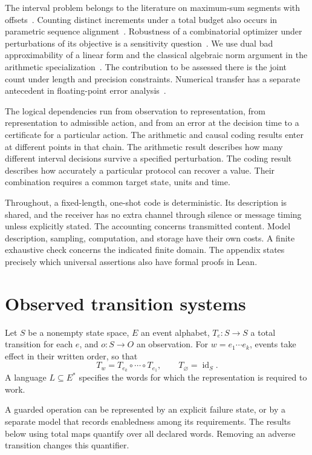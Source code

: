 The interval problem belongs to the literature on maximum-sum segments with offsets~\cite{sakai,jo}. Counting distinct increments under a total budget also occurs in parametric sequence alignment~\cite{gusfield}. Robustness of a combinatorial optimizer under perturbations of its objective is a sensitivity question~\cite{chak}. We use dual bad approximability of a linear form and the classical algebraic norm argument in the arithmetic specialization~\cite{fgm}. The contribution to be assessed there is the joint count under length and precision constraints. Numerical transfer has a separate antecedent in floating-point error analysis~\cite{goldberg}.

The logical dependencies run from observation to representation, from representation to admissible action, and from an error at the decision time to a certificate for a particular action. The arithmetic and causal coding results enter at different points in that chain. The arithmetic result describes how many different interval decisions survive a specified perturbation. The coding result describes how accurately a particular protocol can recover a value. Their combination requires a common target state, units and time.

Throughout, a fixed-length, one-shot code is deterministic. Its description is shared, and the receiver has no extra channel through silence or message timing unless explicitly stated. The accounting concerns transmitted content. Model description, sampling, computation, and storage have their own costs. A finite exhaustive check concerns the indicated finite domain. The appendix states precisely which universal assertions also have formal proofs in Lean.

\section{Observed transition systems}
\begin{definition}[System]\label{def:system}
Let $S$ be a nonempty state space, $E$ an event alphabet, $T_e:S\to S$ a total transition for each $e$, and $o:S\to O$ an observation. For $w=e_1\cdots e_k$, events take effect in their written order, so that
\[
T_w=T_{e_k}\circ\cdots\circ T_{e_1},\qquad T_{\varnothing}=\operatorname{id}_S .
\]
A language $L\subseteq E^*$ specifies the words for which the representation is required to work.
\end{definition}
A guarded operation can be represented by an explicit failure state, or by a separate model that records enabledness among its requirements. The results below using total maps quantify over all declared words. Removing an adverse transition changes this quantifier.


